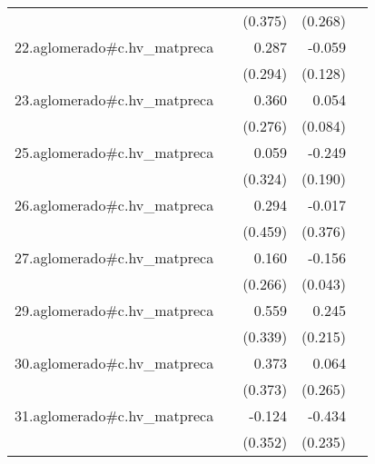 {\begin{longtable}{l*{4}{D{.}{.}{-1}}}
            &                     &     (0.375)         &     (0.268)         &                     \\
\addlinespace
22.aglomerado#c.hv\_matpreca&                     &       0.287         &      -0.059         &                     \\
            &                     &     (0.294)         &     (0.128)         &                     \\
\addlinespace
23.aglomerado#c.hv\_matpreca&                     &       0.360         &       0.054         &                     \\
            &                     &     (0.276)         &     (0.084)         &                     \\
\addlinespace
25.aglomerado#c.hv\_matpreca&                     &       0.059         &      -0.249         &                     \\
            &                     &     (0.324)         &     (0.190)         &                     \\
\addlinespace
26.aglomerado#c.hv\_matpreca&                     &       0.294         &      -0.017         &                     \\
            &                     &     (0.459)         &     (0.376)         &                     \\
\addlinespace
27.aglomerado#c.hv\_matpreca&                     &       0.160         &      -0.156\sym{***}&                     \\
            &                     &     (0.266)         &     (0.043)         &                     \\
\addlinespace
29.aglomerado#c.hv\_matpreca&                     &       0.559         &       0.245         &                     \\
            &                     &     (0.339)         &     (0.215)         &                     \\
\addlinespace
30.aglomerado#c.hv\_matpreca&                     &       0.373         &       0.064         &                     \\
            &                     &     (0.373)         &     (0.265)         &                     \\
\addlinespace
31.aglomerado#c.hv\_matpreca&                     &      -0.124         &      -0.434         &                     \\
            &                     &     (0.352)         &     (0.235)         &                     \\

\end{longtable}}
